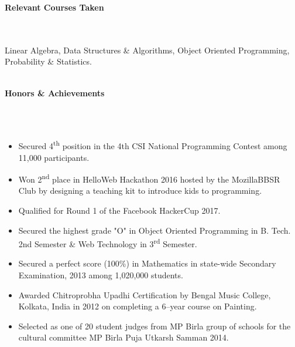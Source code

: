 \documentclass[a4paper,10pt]{article}
\newcommand{\lsep}{-0.5cm}
\newcommand{\resheading}[1]{{\large \colorbox{mygrey}{\begin{minipage}{0.99\textwidth}{\textbf{#1 \vphantom{p\^{E}}}}\end{minipage}}}}
\begin{document}
\resheading{\textbf{Relevant Courses Taken} }\\\\[\lsep]

\indent Linear Algebra, Data Structures \& Algorithms, Object Oriented Programming, Probability \& Statistics.\\\\


\resheading{\textbf{Honors \& Achievements}}\\[\lsep]\\[-0.2cm]
\begin{itemize}
\item {Secured 4\textsuperscript{th} position in the 4th CSI National Programming Contest among 11,000 participants.}
\item {Won 2\textsuperscript{nd} place in HelloWeb Hackathon 2016 hosted by the MozillaBBSR Club by designing a teaching kit to introduce kids to programming.}
\item {Qualified for Round 1 of the Facebook HackerCup 2017.}
\item {Secured the highest grade "O" in Object Oriented Programming in B. Tech. 2nd Semester \& Web Technology in 3\textsuperscript{rd} Semester.}
\item {Secured a perfect score (100\%) in Mathematics in state-wide Secondary Examination, 2013 among 1,020,000 students.}
\item {Awarded Chitroprobha Upadhi Certification by Bengal Music College, Kolkata, India in 2012 on completing a 6--year course on Painting.}\item{Selected as one of 20 student judges from MP Birla group of schools for the cultural committee MP Birla Puja Utkarsh Samman 2014.}
\end{itemize}
\end{document}
